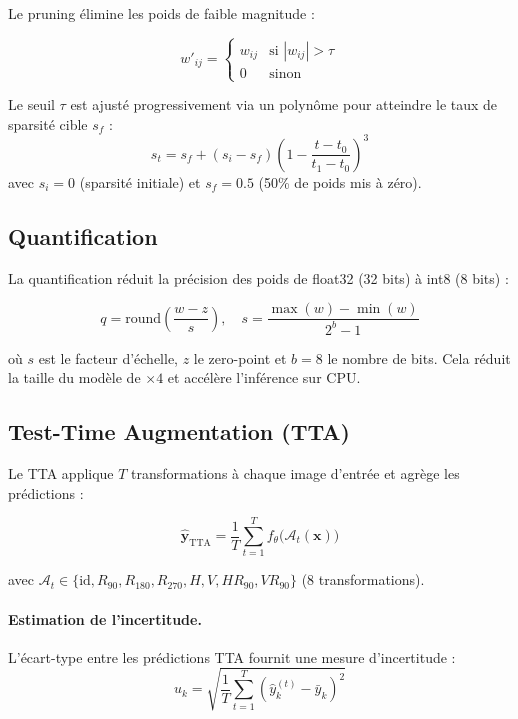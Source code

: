 \documentclass[11pt,a4paper]{article}
\begin{document}
Le pruning élimine les poids de faible magnitude :

\begin{equation}
  w'_{ij} = \begin{cases}
    w_{ij} & \text{si } |w_{ij}| > \tau \\
    0 & \text{sinon}
  \end{cases}
\end{equation}

Le seuil $\tau$ est ajusté progressivement via un polynôme pour atteindre le taux de sparsité cible $s_f$ :
\begin{equation}
  s_t = s_f + (s_i - s_f)\left(1 - \frac{t - t_0}{t_1 - t_0}\right)^3
\end{equation}
avec $s_i = 0$ (sparsité initiale) et $s_f = 0.5$ (50\% de poids mis à zéro).

\subsection{Quantification}

La quantification réduit la précision des poids de float32 (32 bits) à int8 (8 bits) :

\begin{equation}
  q = \text{round}\!\left(\frac{w - z}{s}\right), \quad s = \frac{\max(w) - \min(w)}{2^b - 1}
\end{equation}

où $s$ est le facteur d'échelle, $z$ le zero-point et $b = 8$ le nombre de bits. Cela réduit la taille du modèle de $\times 4$ et accélère l'inférence sur CPU.

\subsection{Test-Time Augmentation (TTA)}

Le TTA applique $T$ transformations à chaque image d'entrée et agrège les prédictions :

\begin{equation}
  \boxed{\hat{\mathbf{y}}_{\text{TTA}} = \frac{1}{T} \sum_{t=1}^{T} f_\theta\!\big(\mathcal{A}_t(\mathbf{x})\big)}
\end{equation}

avec $\mathcal{A}_t \in \{\text{id}, R_{90}, R_{180}, R_{270}, H, V, HR_{90}, VR_{90}\}$ (8 transformations).

\paragraph{Estimation de l'incertitude.} L'écart-type entre les prédictions TTA fournit une mesure d'incertitude :
\begin{equation}
  u_k = \sqrt{\frac{1}{T}\sum_{t=1}^{T}\left(\hat{y}_{k}^{(t)} - \bar{y}_k\right)^2}
\end{equation}
\end{document}
